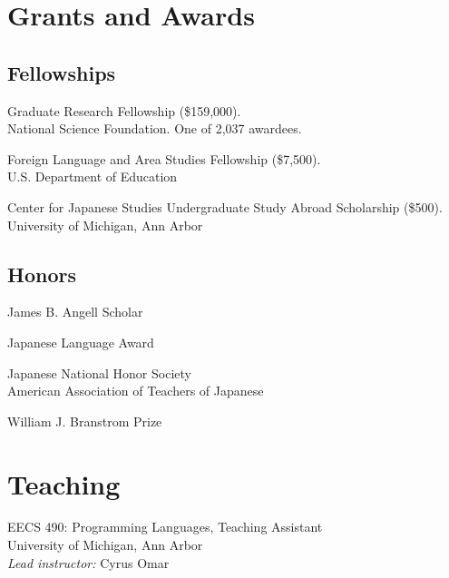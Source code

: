 \documentclass[11pt,letterpaper]{report} %
\begin{document}
\section*{Grants and Awards}

\subsection*{Fellowships}
\begin{tablist}
  \item[2024--29] \tab{}Graduate Research Fellowship (\$159,000)\@. \\
                   National Science Foundation. One of 2,037 awardees.

  \item[2023]     \tab{}Foreign Language and Area Studies Fellowship (\$7,500)\@. \\
                   U.S. Department of Education

  \item[2023]     \tab{}Center for Japanese Studies Undergraduate Study Abroad Scholarship (\$500)\@. \\
                   University of Michigan, Ann Arbor
\end{tablist}

\subsection*{Honors}
\begin{tablist}
  \item[2024] \tab{}James B. Angell Scholar

  \item[2024] \tab{}Japanese Language Award

  \item[2024] \tab{}Japanese National Honor Society \\
         American Association of Teachers of Japanese

  \item[2022] \tab{}William J. Branstrom Prize

\end{tablist}

\section*{Teaching}
\begin{tablist}
  \item[2023--24] \tab{}EECS 490: Programming Languages, Teaching Assistant \\
                   University of Michigan, Ann Arbor \\
                   \emph{Lead instructor:} Cyrus Omar
\end{tablist}
\end{document}
